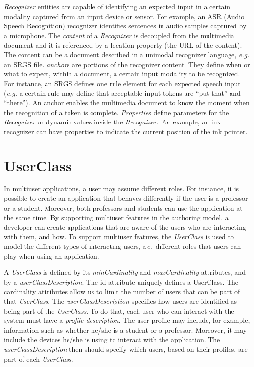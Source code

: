 \documentclass[
  doutorado,
  american
]{ThesisPUC}
\begin{document}
\textit{Recognizer} entities are capable of identifying an expected input in a
certain modality captured from an input device or sensor. For example, an ASR
(Audio Speech Recognition) recognizer identifies sentences in audio samples
captured by a microphone. The \textit{content} of a \textit{Recognizer} is
decoupled from the multimedia document and it is referenced by a location
property (the URL of the content). The content can be a document described in a
unimodal recognizer language, \textit{e.g.} an SRGS file. \textit{anchor}s are portions
of the recognizer content. They define when or what to expect, within a
document, a certain input modality to be recognized. For instance, an SRGS
defines one rule element for each expected speech input (\textit{e.g.} a certain rule may
define that acceptable input tokens are “put that” and “there”). An anchor
enables the multimedia document to know the moment when the recognition of a
token is complete. \textit{Propertie}s define parameters for the
\textit{Recognizer} or dynamic values inside the \textit{Recognizer}. For
example, an ink recognizer can have properties to indicate the current position
of the ink pointer. 

\section{UserClass}
\label{sec:approuach:userclass}

In multiuser applications, a user may assume different roles. For instance, it
is possible to create an application that behaves differently if the user is a
professor or a student. Moreover, both professors and students can use the
application at the same time. By supporting multiuser features in the authoring
model, a developer can create applications that are aware of the users who are
interacting with them, and how. To support multiuser features, the 
\textit{UserClass} is used to model the different types of interacting users,
\textit{i.e.}~different roles that users can play when using an application.

A \textit{UserClass} is defined by its \textit{minCardinality} and 
\textit{maxCardinality} attributes, and by a \textit{userClassDescription}. The
id attribute uniquely defines a UserClass. The cardinality attributes allow us
to limit the number of users that can be part of that \textit{UserClass}. The
\textit{userClassDescription} specifies how users are identified as being part
of the \textit{UserClass}. To do that, each user who can interact with the
system must have a \textit{profile description}. The user profile may include,
for example, information such as whether he/she is a student or a professor.
Moreover, it may include the devices he/she is using to interact with the
application. The \textit{userClassDescription} then should specify which users,
based on their profiles, are part of each \textit{UserClass}. 
\end{document}
